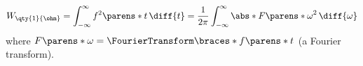 \begin{multicols}{2}
\begin{CheatsheetEntryFrame}

    \end{CheatsheetEntryFrame}

    \begin{CheatsheetEntryFrame}

        \begin{equation*}
            W_{\qty{1}{\ohm}}
            = \int_{-\infty}^\infty f^2\parens*{t} \,\diff{t}
            = \frac{1}{2 \pi} \int_{-\infty}^\infty{
                \abs*{F\parens*{\omega}}^2 \,\diff{\omega}
            }
        \end{equation*}
        where $F\parens*{\omega} = \FourierTransform\braces*{f\parens*{t}}$ (a Fourier transform).


    \end{CheatsheetEntryFrame}

    \begin{CheatsheetEntryFrame}



    \end{CheatsheetEntryFrame}

\end{multicols}

